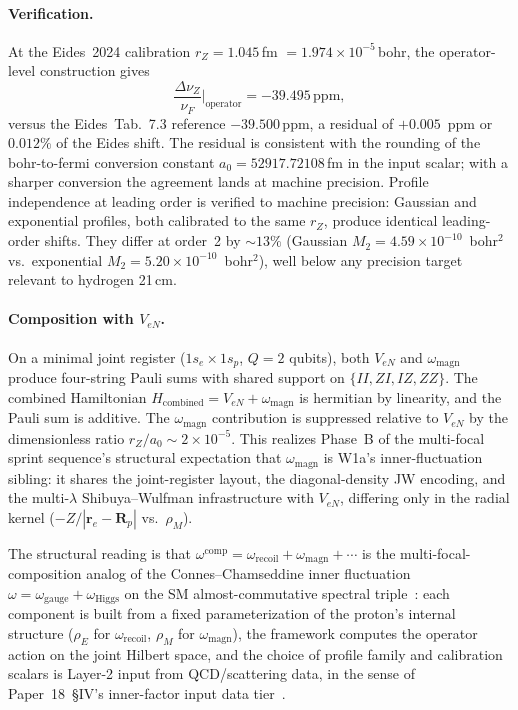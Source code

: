 \documentclass[twocolumn,prc,amsmath,amssymb,superscriptaddress]{revtex4-2}
\begin{document}
\paragraph{Verification.}
At the Eides~2024 calibration $r_Z = 1.045$\,fm
$= 1.974 \times 10^{-5}$\,bohr, the operator-level construction gives
\begin{equation}
  \frac{\Delta\nu_Z}{\nu_F}\Big|_{\mathrm{operator}}
  = -39.495\,\mathrm{ppm},
\end{equation}
versus the Eides~Tab.~7.3 reference $-39.500$\,ppm, a residual of
$+0.005$~ppm or $0.012\%$ of the Eides shift. The residual is
consistent with the rounding of the bohr-to-fermi conversion constant
$a_0 = 52917.72108$\,fm in the input scalar; with a sharper conversion
the agreement lands at machine precision. Profile independence at
leading order is verified to machine precision: Gaussian and
exponential profiles, both calibrated to the same $r_Z$, produce
identical leading-order shifts. They differ at order~2 by $\sim 13\%$
(Gaussian $M_2 = 4.59 \times 10^{-10}$~bohr$^2$ vs.~exponential
$M_2 = 5.20 \times 10^{-10}$~bohr$^2$), well below any precision target
relevant to hydrogen 21\,cm.

\paragraph{Composition with $V_{eN}$.}
On a minimal joint register ($1s_e \times 1s_p$, $Q = 2$ qubits), both
$V_{eN}$ and $\omega_{\mathrm{magn}}$ produce four-string Pauli sums
with shared support on $\{II, ZI, IZ, ZZ\}$. The combined Hamiltonian
$H_{\mathrm{combined}} = V_{eN} + \omega_{\mathrm{magn}}$ is hermitian
by linearity, and the Pauli sum is additive. The
$\omega_{\mathrm{magn}}$ contribution is suppressed relative to $V_{eN}$
by the dimensionless ratio $r_Z / a_0 \sim 2 \times 10^{-5}$. This
realizes Phase~B of the multi-focal sprint sequence's structural
expectation that $\omega_{\mathrm{magn}}$ is W1a's
inner-fluctuation sibling: it shares the joint-register layout, the
diagonal-density JW encoding, and the multi-$\lambda$ Shibuya--Wulfman
infrastructure with $V_{eN}$, differing only in the radial kernel
($-Z/|\mathbf{r}_e - \mathbf{R}_p|$ vs.~$\rho_M$).

The structural reading is that $\omega^{\mathrm{comp}}
= \omega_{\mathrm{recoil}} + \omega_{\mathrm{magn}} + \cdots$ is the
multi-focal-composition analog of the Connes--Chamseddine inner
fluctuation $\omega = \omega_{\mathrm{gauge}} + \omega_{\mathrm{Higgs}}$
on the SM almost-commutative spectral
triple~\cite{ChamseddineConnes2010,Paper32}: each component is built
from a fixed parameterization of the proton's internal structure
($\rho_E$ for $\omega_{\mathrm{recoil}}$, $\rho_M$ for
$\omega_{\mathrm{magn}}$), the framework computes the operator action
on the joint Hilbert space, and the choice of profile family and
calibration scalars is Layer-2 input from QCD/scattering data, in the
sense of Paper~18~\S IV's inner-factor input data
tier~\cite{Paper18}.
\end{document}
